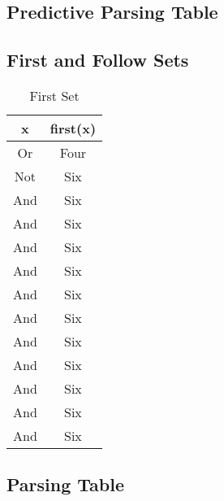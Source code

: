 \documentclass[11pt]{article}
\begin{document}
\subsection{Predictive Parsing Table}

\subsection{First and Follow Sets}

\begin{table}
\renewcommand{\arraystretch}{1.3}
\caption{First Set}
\label{tab:example}
\centering
\begin{tabular}{c|c}
    x  &  first(x)\\
    \hline
    Or   &   Four\\
    Not    &   Six\\
	And    &   Six\\
	And    &   Six\\
	And    &   Six\\
	And    &   Six\\
	And    &   Six\\
	And    &   Six\\
	And    &   Six\\
	And    &   Six\\
	And    &   Six\\
	And    &   Six\\
	And    &   Six\\
	
\end{tabular}
\end{table}


\subsection{Parsing Table}
\end{document}
